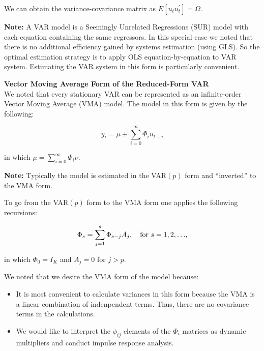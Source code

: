 \documentclass[11pt]{article}
\begin{document}
\vspace{3mm}
We can obtain the variance-covariance matrix as $E[u_{t}u_{t}^{\prime}] = \Omega$.

\vspace{3mm}
\textbf{Note:} A VAR model is a Seemingly Unrelated Regressions (SUR) model with each equation containing the same regressors. 
In this special case we noted that there is no additional efficiency gained by systems estimation (using GLS).  So the optimal
estimation strategy is to apply OLS equation-by-equation to VAR system. Estimating the VAR system in this form is particularly 
convenient.

\vspace{10mm}
\textbf{Vector Moving Average Form of the Reduced-Form VAR} \\

\vspace{3.5mm}
We noted that every stationary VAR can be represented as an infinite-order Vector Moving Average (VMA) model.  The model in this
form is given by the following:

\vspace{3.5mm}
\begin{equation*}
y_{t} = \mu + \sum\limits_{i=0}^{\infty} \Phi_{i} u_{t-i}
\end{equation*}

in which $\mu = \sum\limits_{i=0}^{\infty} \Phi_{i} \nu$.

\vspace{3mm}
\textbf{Note:} Typically the model is estimated in the VAR$(p)$ form and ``inverted'' to the VMA form.

\newpage
To go from the VAR$(p)$ form to the VMA form one applies the following recursions:\

\begin{equation*}
\Phi_{s} = \sum\limits_{j=1}^{s} \Phi_{s-j} A_{j}, \mbox{\quad for $s = 1, 2, \ldots$,}
\end{equation*}

in which $\Phi_{0} = I_{K}$ and $A_{j} = 0$ for $j > p$.

\vspace{3.5mm}
We noted that we desire the VMA form of the model because:
\begin{itemize}
 \item It is most convenient to calculate variances in this form because the VMA is a linear combination
       of indenpendent terms. Thus, there are no covariance terms in the calculations.
 \item We would like to interpret the $\phi_{ij}$ elements of the $\Phi_{i}$ matrices as dynamic multipliers 
       and conduct impulse response analysis. 
\end{itemize}
\end{document}
